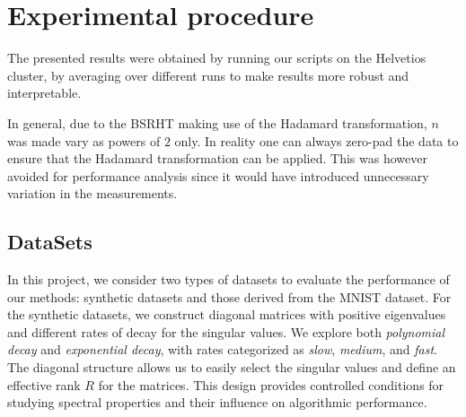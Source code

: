 \documentclass[a4paper, 12pt,oneside]{article}
\begin{document}
	\section{Experimental procedure}
		The presented results were obtained by running our scripts on the Helvetios cluster, by averaging over different runs to make results more robust and interpretable.
		
		In general, due to the BSRHT making use of the Hadamard transformation, $n$ was made vary as powers of $2$ only. In reality one can always zero-pad the data to ensure that the Hadamard transformation can be applied. This was however avoided for performance analysis since it would have introduced unnecessary variation in the measurements.  
		\subsection{DataSets}
		In this project, we consider two types of datasets to evaluate the performance of our methods: synthetic datasets and those derived from the MNIST dataset. For the synthetic datasets, we construct diagonal matrices with positive eigenvalues and different rates of decay for the singular values. We explore both \textit{polynomial decay} and \textit{exponential decay}, with rates categorized as \textit{slow}, \textit{medium}, and \textit{fast}. The diagonal structure allows us to easily select the singular values and define an effective rank \( R \) for the matrices. This design provides controlled conditions for studying spectral properties and their influence on algorithmic performance.
\end{document}
